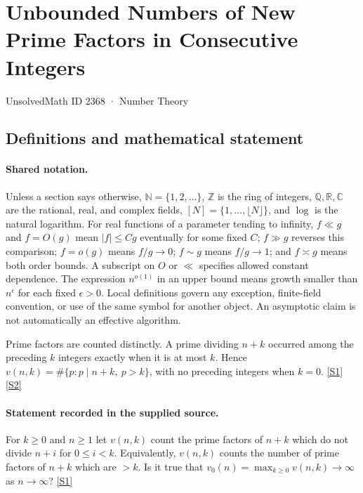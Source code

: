 \documentclass[11pt,a4paper]{article}
\newcommand{\N}{\mathbb{N}}
\newcommand{\Z}{\mathbb{Z}}
\newcommand{\Q}{\mathbb{Q}}
\newcommand{\R}{\mathbb{R}}
\newcommand{\C}{\mathbb{C}}
\newcommand{\sref}[2]{\hyperlink{source:#1:#2}{[S#2]}}
\begin{document}

\setcounter{section}{2367}

\section{Unbounded Numbers of New Prime Factors in Consecutive Integers}\label{2368}

{\small\sffamily UnsolvedMath ID 2368 · Number Theory}

\subsection{Definitions and mathematical statement}

\paragraph{Shared notation.}Unless a section says otherwise, $\N=\{1,2,\ldots\}$,
$\Z$ is the ring of integers, $\Q,\R,\C$ are the rational, real, and complex
fields, $[N]=\{1,\ldots,\lfloor N\rfloor\}$, and $\log$ is the natural
logarithm. For real functions of a parameter tending to infinity,
$f\ll g$ and $f=O(g)$ mean $|f|\leq Cg$ eventually for some fixed $C$;
$f\gg g$ reverses this comparison; $f=o(g)$ means $f/g\to0$;
$f\sim g$ means $f/g\to1$; and $f\asymp g$ means both order bounds.
A subscript on $O$ or $\ll$ specifies allowed constant dependence.
The expression $n^{o(1)}$ in an upper bound means growth smaller than
$n^\epsilon$ for each fixed $\epsilon>0$. Local definitions govern any
exception, finite-field convention, or use of the same symbol for another
object. An asymptotic claim is not automatically an effective algorithm.



Prime factors are counted distinctly. A prime dividing $n+k$ occurred among the preceding $k$ integers exactly when it is at most $k$. Hence $v(n,k)=\#\{p:p\mid n+k,\ p>k\}$, with no preceding integers when $k=0$. \sref{2368}{1} \sref{2368}{2}

\paragraph{Statement recorded in the supplied source.}
For $k\geq 0$ and $n\geq 1$ let $v(n,k)$ count the prime factors of $n+k$ which do not divide $n+i$ for $0\leq i<k$. Equivalently, $v(n,k)$ counts the number of prime factors of $n+k$ which are $>k$.
Is it true that $ v_0(n)=\max_{k\geq 0}v(n,k)\to \infty $ as $n\to \infty$? \sref{2368}{1}
\end{document}
